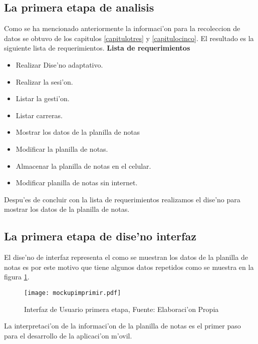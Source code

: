 \subsection{La primera etapa de analisis}
Como se ha mencionado anteriormente la informaci'on para la recoleccion de datos se obtuvo de los capitulos \ref{capitulotres} y \ref{capitulocinco}. El resultado es la siguiente lista de requerimientos.
\textbf{Lista de requerimientos}
\begin{itemize}
\item Realizar Dise'no adaptativo.
\item Realizar la sesi'on.
\item Listar la gesti'on.
\item Listar carreras.
\item Mostrar los datos de la planilla de notas
\item Modificar la planilla de notas.
\item Almacenar la planilla de notas en el celular. 
\item Modificar planilla de notas sin internet.
\end{itemize}

Despu'es de concluir con la lista de requerimientos realizamos el dise'no para mostrar los datos de la planilla de notas.

\subsection{La primera etapa de dise'no interfaz}
\label{Doc:Interfaz}
El dise'no de interfaz representa el como se muestran los datos de la planilla de notas es por este motivo que tiene algunos datos repetidos como se muestra en la figura \ref{fig:IU}.
\begin{figure}[H]
\centering
\texttt{[image: mockupimprimir.pdf]}
\captionsetup{justification=centering,margin=2cm}
\caption{Interfaz de Usuario primera etapa, Fuente: Elaboraci'on Propia}
\label{fig:IU}
\end{figure}

La interpretaci'on de la informaci'on de la planilla de notas es el primer paso para el desarrollo de la aplicaci'on m'ovil.

